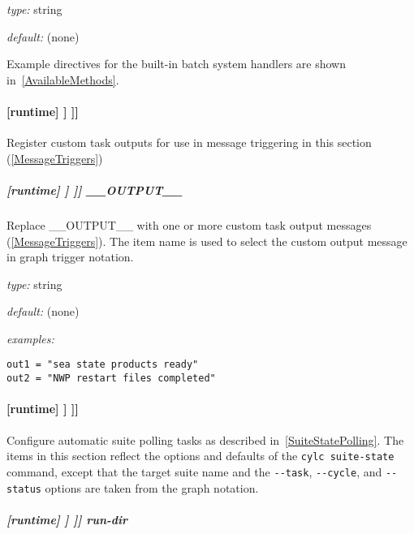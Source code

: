 \begin{myitemize}
\item {\em type:} string
\item {\em default:} (none)
\end{myitemize}

Example directives for the built-in batch system handlers are shown
in~\ref{AvailableMethods}.

\paragraph[{[[[}outputs{]]]}]{[runtime] \textrightarrow [[\_\_NAME\_\_]] \textrightarrow [[[outputs]]]}

Register custom task outputs for use in message triggering in this section
(\ref{MessageTriggers})

\subparagraph[\_\_OUTPUT\_\_ ]{[runtime] \textrightarrow [[\_\_NAME\_\_]] \textrightarrow [[[outputs]]] \textrightarrow \_\_OUTPUT\_\_}

Replace \_\_OUTPUT\_\_ with one or more custom task output messages
(\ref{MessageTriggers}).  The item name is used to select the custom output
message in graph trigger notation.
\begin{myitemize}
    \item {\em type:} string
    \item {\em default:} (none)
    \item{ \em examples:}
\end{myitemize}
\begin{lstlisting}
out1 = "sea state products ready"
out2 = "NWP restart files completed"
\end{lstlisting}

\paragraph[{[[[}suite state polling{]]]}]{[runtime] \textrightarrow [[\_\_NAME\_\_]] \textrightarrow [[[suite state polling]]]}

\lstset{language=transcript}
Configure automatic suite polling tasks as described
in~\ref{SuiteStatePolling}. The
items in this section reflect the options and defaults of the
\lstinline=cylc suite-state= command, except that the target suite name and the
\lstinline=--task=, \lstinline=--cycle=, and \lstinline=--status= options are
taken from the graph notation.

\subparagraph[run-dir]{[runtime] \textrightarrow [[\_\_NAME\_\_]] \textrightarrow [[[suite state polling]]] \textrightarrow run-dir}

